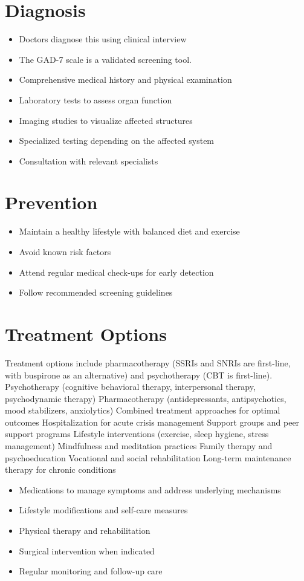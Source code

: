\section{Diagnosis}
\begin{itemize}[noitemsep]
  \item Doctors diagnose this using clinical interview
  \item The GAD-7 scale is a validated screening tool.
  \item Comprehensive medical history and physical examination
  \item Laboratory tests to assess organ function
  \item Imaging studies to visualize affected structures
  \item Specialized testing depending on the affected system
  \item Consultation with relevant specialists
\end{itemize}
\section{Prevention}
\begin{itemize}[noitemsep]
  \item Maintain a healthy lifestyle with balanced diet and exercise
  \item Avoid known risk factors
  \item Attend regular medical check-ups for early detection
  \item Follow recommended screening guidelines
\end{itemize}
\section{Treatment Options}
Treatment options include pharmacotherapy (SSRIs and SNRIs are first-line, with buspirone as an alternative) and psychotherapy (CBT is first-line). Psychotherapy (cognitive behavioral therapy, interpersonal therapy, psychodynamic therapy) Pharmacotherapy (antidepressants, antipsychotics, mood stabilizers, anxiolytics) Combined treatment approaches for optimal outcomes Hospitalization for acute crisis management Support groups and peer support programs Lifestyle interventions (exercise, sleep hygiene, stress management) Mindfulness and meditation practices Family therapy and psychoeducation Vocational and social rehabilitation Long-term maintenance therapy for chronic conditions

\begin{itemize}[noitemsep]
  \item Medications to manage symptoms and address underlying mechanisms
  \item Lifestyle modifications and self-care measures
  \item Physical therapy and rehabilitation
  \item Surgical intervention when indicated
  \item Regular monitoring and follow-up care
\end{itemize}
